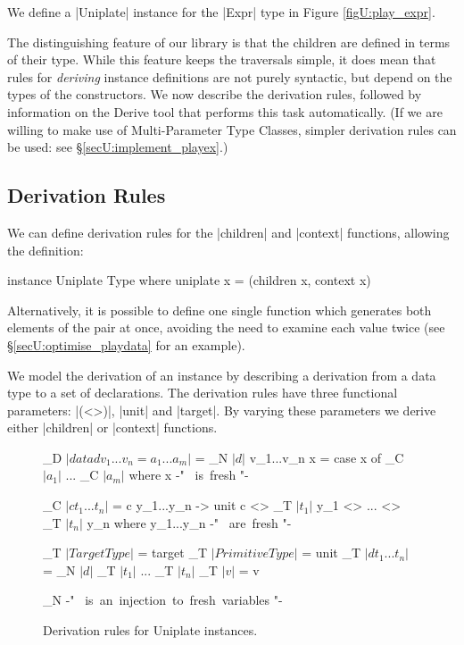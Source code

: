 We define a |Uniplate| instance for the |Expr| type in Figure \ref{figU:play_expr}.

The distinguishing feature of our library is that the children are defined in terms of their type. While this feature keeps the traversals simple, it does mean that rules for \textit{deriving} instance definitions are not purely syntactic, but depend on the types of the constructors. We now describe the derivation rules, followed by information on the Derive tool that performs this task automatically. (If we are willing to make use of Multi-Parameter Type Classes, simpler derivation rules can be used: see \S\ref{secU:implement_playex}.)


\subsection{Derivation Rules}

We can define derivation rules for the |children| and |context| functions, allowing the definition:

\ignore\begin{code}
instance Uniplate Type where
    uniplate x = (children x, context x)
\end{code}

Alternatively, it is possible to define one single function which generates both elements of the pair at once, avoiding the need to examine each value twice (see \S\ref{secU:optimise_playdata} for an example).

We model the derivation of an instance by describing a derivation from a data type to a set of declarations. The derivation rules have three functional parameters: |(<>)|, |unit| and |target|. By varying these parameters we derive either |children| or |context| functions.

\begin{figure}
\ignore\begin{code}
_D $| data d v_1...v_n = a_1...a_m |$ =
        _N $| d |$ \? v_1...v_n x = case  x of _C $| a_1 |$ \? ... \? _C $| a_m |$
    where x {-" \mbox{ is fresh} "-}

_C $| c t_1...t_n |$ =
        c y_1...y_n -> unit c <> _T $| t_1 |$ \? y_1 <> ... <> _T $| t_n |$ \? y_n
    where y_1...y_n {-" \mbox{ are fresh} "-}

_T $| TargetType     |$ = target
_T $| PrimitiveType  |$ = unit
_T $| d t_1...t_n    |$ = _N $| d |$ \? _T $| t_1 |$ \? ... \? _T $| t_n |$
_T $| v              |$ = v

_N {-" \mbox{ is an injection to fresh variables} "-}
\end{code}
\caption{Derivation rules for Uniplate instances.}
\label{figU:derive}
\end{figure}

